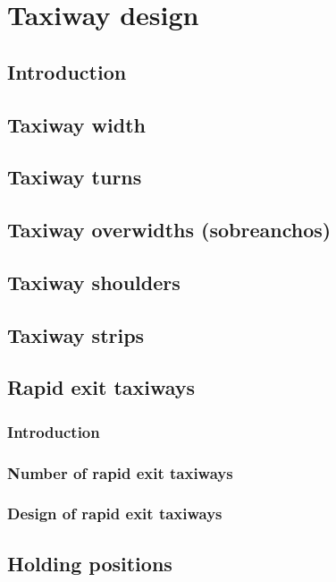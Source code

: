 \chapter{Taxiway design}
	
	\section{Introduction}
	
	\section{Taxiway width}
	
	\section{Taxiway turns}
	
	\section{Taxiway overwidths (sobreanchos)}
	
	\section{Taxiway shoulders}
	
	\section{Taxiway strips}
	
	\section{Rapid exit taxiways}
		\subsection{Introduction}
		\subsection{Number of rapid exit taxiways}
		\subsection{Design of rapid exit taxiways}
	
	\section{Holding positions}
